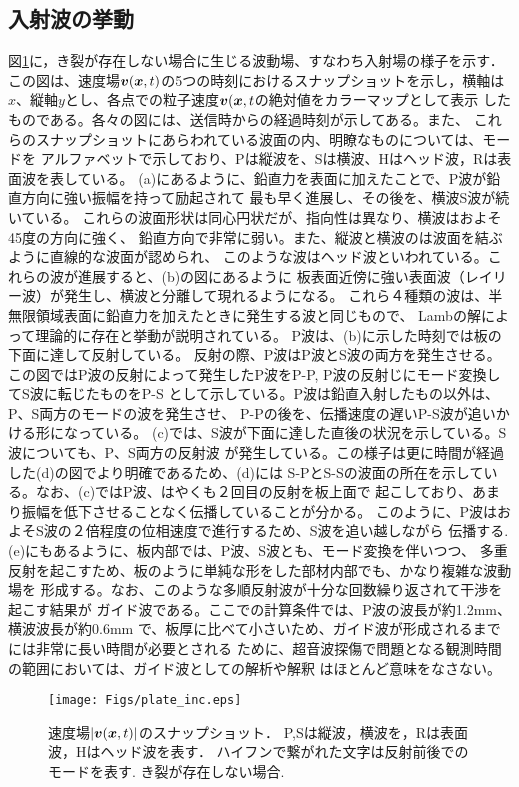 \subsection{入射波の挙動}
図\ref{fig:fig3_1}に，き裂が存在しない場合に生じる波動場、すなわち入射場の様子を示す．
この図は、速度場$\mbox{\boldmath $v$}(\mbox{\boldmath $x$},t)$の5つの時刻におけるスナップショットを示し，横軸は
$x$、縦軸$y$とし、各点での粒子速度$\mbox{\boldmath $v$}(\mbox{\boldmath $x$},t$の絶対値をカラーマップとして表示
したものである。各々の図には、送信時からの経過時刻が示してある。また、
これらのスナップショットにあらわれている波面の内、明瞭なものについては、モードを
アルファベットで示しており、Pは縦波を、Sは横波、Hはヘッド波，Rは表面波を表している。
(a)にあるように、鉛直力を表面に加えたことで、P波が鉛直方向に強い振幅を持って励起されて
最も早く進展し、その後を、横波S波が続いている。
これらの波面形状は同心円状だが、指向性は異なり、横波はおよそ45度の方向に強く、
鉛直方向で非常に弱い。また、縦波と横波のは波面を結ぶように直線的な波面が認められ、
このような波はヘッド波といわれている。これらの波が進展すると、(b)の図にあるように
板表面近傍に強い表面波（レイリー波）が発生し、横波と分離して現れるようになる。
これら４種類の波は、半無限領域表面に鉛直力を加えたときに発生する波と同じもので、
Lambの解によって理論的に存在と挙動が説明されている。
P波は、(b)に示した時刻では板の下面に達して反射している。
反射の際、P波はP波とS波の両方を発生させる。
この図ではP波の反射によって発生したP波をP-P, P波の反射じにモード変換してS波に転じたものをP-S
として示している。P波は鉛直入射したもの以外は、P、S両方のモードの波を発生させ、
P-Pの後を、伝播速度の遅いP-S波が追いかける形になっている。
(c)では、S波が下面に達した直後の状況を示している。S波についても、P、S両方の反射波
が発生している。この様子は更に時間が経過した(d)の図でより明確であるため、(d)には
S-PとS-Sの波面の所在を示している。なお、(c)ではP波、はやくも２回目の反射を板上面で
起こしており、あまり振幅を低下させることなく伝播していることが分かる。
このように、P波はおよそS波の２倍程度の位相速度で進行するため、S波を追い越しながら
伝播する.(e)にもあるように、板内部では、P波、S波とも、モード変換を伴いつつ、
多重反射を起こすため、板のように単純な形をした部材内部でも、かなり複雑な波動場を
形成する。なお、このような多順反射波が十分な回数繰り返されて干渉を起こす結果が
ガイド波である。ここでの計算条件では、P波の波長が約1.2mm、横波波長が約0.6mm
で、板厚に比べて小さいため、ガイド波が形成されるまでには非常に長い時間が必要とされる
ために、超音波探傷で問題となる観測時間の範囲においては、ガイド波としての解析や解釈
はほとんど意味をなさない。
\begin{figure}[h]
	\begin{center}
	\texttt{[image: Figs/plate\_inc.eps]} 
	\end{center}
	\caption{
		速度場$|\mbox{\boldmath $v$}(\mbox{\boldmath $x$},t)|$のスナップショット．
		P,Sは縦波，横波を，Rは表面波，Hはヘッド波を表す．
		ハイフンで繋がれた文字は反射前後でのモードを表す. き裂が存在しない場合.
	} 
	\label{fig:fig3_1}
\end{figure}
